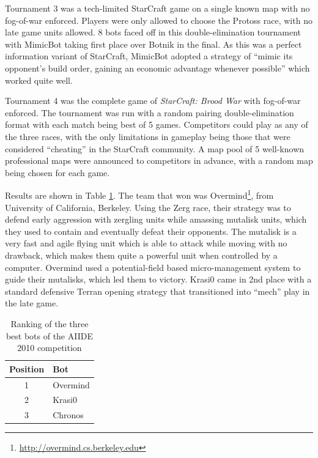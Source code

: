 \documentclass[journal]{IEEEtran}
\begin{document}
Tournament 3 was a tech-limited StarCraft game on a single known map with no fog-of-war enforced. Players
were only allowed to choose the Protoss race, with no late game units allowed. 8 bots
faced off in this double-elimination tournament with MimicBot taking first place over Botnik in the final.
As this was a perfect information variant of StarCraft, MimicBot adopted a strategy of
``mimic its opponent's build order, gaining an economic advantage whenever possible'' which
worked quite well.

Tournament 4 was the complete game of {\em StarCraft: Brood War} with fog-of-war enforced. The tournament
was run with a random pairing double-elimination format with each match being best of 5 games.
Competitors could play as any of the three races, with the only limitations in gameplay
being those that were considered ``cheating'' in the StarCraft community. A map pool of
5 well-known professional maps were announced to competitors in advance, with a random map being chosen for each game.

Results are shown in Table \ref{tab:aiide2010}. The team that won was Overmind\footnote{\url{http://overmind.cs.berkeley.edu}}, from University of California, Berkeley. Using the Zerg race, their
strategy was to defend early aggression with zergling units while amassing mutalisk units,
which they used to contain and eventually defeat their opponents. The mutalisk is a very fast and agile
flying unit which is able to attack while moving with no drawback, which makes them quite a powerful
unit when controlled by a computer. Overmind used a potential-field
based micro-management system to guide their mutalisks, which led them to victory. Krasi0 came in 2nd place
with a standard defensive Terran opening strategy that transitioned into ``mech'' play in the late game.

\begin{table}[!t]
\caption{Ranking of the three best bots of the AIIDE 2010 competition}
\label{tab:aiide2010}
\centering
\begin{tabular}{|c|l|}
\hline
{\bfseries Position} & {\bfseries Bot}\\
\hline
1 & Overmind \\
2 & Krasi0 \\
3 & Chronos \\
\hline
\end{tabular}
\end{table}
\end{document}
